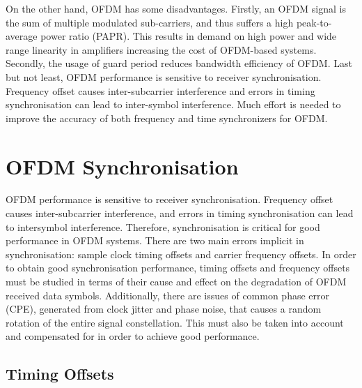 On the other hand, OFDM has some disadvantages. 
Firstly, an OFDM signal is the sum of multiple modulated sub-carriers, and thus suffers a high peak-to-average power ratio (PAPR). 
This results in demand on high power and wide range linearity in amplifiers increasing the cost of OFDM-based systems.
Secondly, the usage of guard period reduces bandwidth efficiency of OFDM.
Last but not least, OFDM performance is sensitive to receiver synchronisation. Frequency offset causes inter-subcarrier interference and errors in timing synchronisation can lead to inter-symbol interference.
Much effort is needed to improve the accuracy of both frequency and time synchronizers for OFDM.



\section{OFDM Synchronisation}

OFDM performance is sensitive to receiver synchronisation. 
Frequency offset causes inter-subcarrier interference, and errors in timing synchronisation can lead to intersymbol interference. 
Therefore, synchronisation is critical for good performance in OFDM systems. 
There are two main errors implicit in synchronisation: sample clock timing offsets and carrier frequency offsets.
In order to obtain good synchronisation performance, timing offsets and frequency offsets must be studied in terms of their cause and effect on the degradation of OFDM received data symbols.
Additionally, there are issues of common phase error (CPE), generated from clock jitter and phase noise, that causes a random rotation of the entire signal constellation.
This must also be taken into account and compensated for in order to achieve good performance.

\subsection{Timing Offsets}

